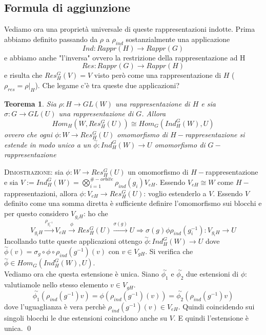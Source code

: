 \documentclass[11pt]{article}
\theoremstyle{plain}
\newtheorem{thm}{Teorema}[section]
\theoremstyle{definition}
\theoremstyle{remark}
\begin{document}
\subsection{Formula di aggiunzione}
Vediamo ora una proprietà universale di queste rappresentazioni indotte. Prima abbiamo definito passando da $\rho$ a $\rho_{ind}$ sostanzialmente una applicazione
\[Ind:Rappr(H)\rightarrow Rappr(G)\]
e abbiamo anche "l'inversa" ovvero la restrizione della rappresentazione ad H
\[Res:Rappr(G)\rightarrow Rappr(H)\]
e risulta che $Res_H^G(V)=V$ visto però come una rappresentazione di $H$ ($\rho_{res}=\rho|_H$). Che legame c'è tra queste due applicazioni? 
\begin{thm}
Sia $\rho:H\rightarrow GL(W)$ una rappresentazione di $H$ e sia $\sigma:G\rightarrow GL(U)$ una rappresentazione di $G$. Allora
\[Hom_H(W,Res_H^G(U))\cong Hom_G(Ind_H^G(W),U)\]
ovvero che ogni $\phi:W\rightarrow Res_H^G(U)$ omomorfismo di $H-$rappresentazione si estende in modo unico a un $\overset{\sim}{\phi}:Ind_H^G(W)\rightarrow U$ omomorfismo di $G-$rappresentazione
\end{thm}
\textsc{Dimostrazione:} sia $\phi:W\rightarrow Res_H^G(U)$ un omomorfismo di $H-$rappresentazione e sia $V:=Ind_H^G(W)=\bigotimes_{i=1}^{\#-orbite} \rho_{ind}(g_i)V_{eH}$. Essendo $V_{eH}\cong W$ come $H-$rappresentazioni, allora $\phi:V_{eH}\rightarrow Res_H^G(U)$: voglio estenderlo a $V$. Essendo $V$ definito come una somma diretta è sufficiente definire l'omomorfismo sui blocchi e per questo considero $V_{g_iH}$: ho che
\[V_{g_iH}\overset{\rho_{g_i^{-1}}}{\rightarrow} V_{eH}\overset{\phi}{\rightarrow} Res_H^G(U)\overset{\sigma(g)}{\rightarrow} U\Rightarrow \sigma(g)\phi\rho_{ind}(g_i^{-1}):V_{g_iH}\rightarrow U\] 
Incollando tutte queste applicazioni ottengo $\overset{\sim}{\phi}:Ind_H^G(W)\rightarrow U$ dove
$\overset{\sim}{\phi}(v)=\sigma_{g}\circ \phi\circ \rho_{ind}(g^{-1})(v)$ con $v\in V_{gH}$. Si verifica che $\overset{\sim}{\phi}\in Hom_G(Ind_H^G(W),U)$. \\
Vediamo ora che questa estensione è unica. Siano $\overset{\sim}{\phi_1}$ e $\overset{\sim}{\phi_2}$ due estensioni di $\phi$: valutiamole nello stesso elemento $v\in V_{gH}$.
\[\overset{\sim}{\phi_1}(\rho_{ind}(g^{-1})v)=\phi(\rho_{ind}(g^{-1})(v))=\overset{\sim}{\phi_2}(\rho_{ind}(g^{-1})v)\]
dove l'uguaglianza è vera perchè $\rho_{ind}(g^{-1})(v)\in V_{eH}$. Quindi coincidendo sui singoli blocchi le due estensioni coincidono anche su $V$. E quindi l'estensione è unica. \qed
\end{document}
